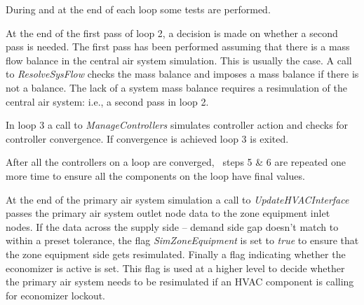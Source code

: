 During and at the end of each loop some tests are performed.

At the end of the first pass of loop 2, a decision is made on whether a second pass is needed. The first pass has been performed assuming that there is a mass flow balance in the central air system simulation. This is usually the case. A call to \emph{ResolveSysFlow} checks the mass balance and imposes a mass balance if there is not a balance. The lack of a system mass balance requires a resimulation of the central air system: i.e., a second pass in loop 2.

In loop 3 a call to \emph{ManageControllers} simulates controller action and checks for controller convergence. If convergence is achieved loop 3 is exited.

After all the controllers on a loop are converged,~ steps 5 \& 6 are repeated one more time to ensure all the components on the loop have final values.

At the end of the primary air system simulation a call to \emph{UpdateHVACInterface} passes the primary air system outlet node data to the zone equipment inlet nodes. If the data across the supply side -- demand side gap doesn't match to within a preset tolerance, the flag \emph{SimZoneEquipment} is set to \emph{true} to ensure that the zone equipment side gets resimulated. Finally a flag indicating whether the economizer is active is set. This flag is used at a higher level to decide whether the primary air system needs to be resimulated if an HVAC component is calling for economizer lockout.
